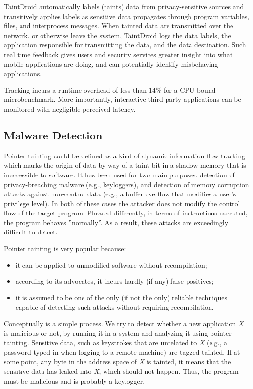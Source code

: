 TaintDroid automatically labels (taints) data from privacy-sensitive sources and transitively applies labels as sensitive data propagates through program variables, files, and interprocess messages. When tainted data are transmitted over the network, or otherwise leave the system, TaintDroid logs the data labels, the application responsible for transmitting the data, and the data destination. Such real time feedback gives users and security services greater insight into what mobile applications are doing, and can potentially identify misbehaving applications. 

Tracking incurs a runtime overhead of less than 14\% for a CPU-bound microbenchmark. More importantly, interactive third-party applications can be monitored with negligible perceived latency.

\subsection{Malware Detection}
Pointer tainting could be defined as a kind of dynamic information flow tracking which marks the origin of data by way of a taint bit in a shadow memory that is inaccessible to software. It has been used for two main purposes: detection of privacy-breaching malware (e.g., keyloggers), and detection of memory corruption attacks against non-control data (e.g., a buffer overflow that modifies a user’s privilege level). In both of these cases the attacker does not modify the control flow of the target program. Phrased differently, in terms of instructions executed, the program behaves ''normally''. As a result, these attacks are exceedingly difficult to detect.

Pointer tainting is very popular because:
\begin{itemize}
	\item it can be applied to unmodified software without recompilation;
	\item according to its advocates, it incurs hardly (if any) false positives;
	\item it is assumed to be one of the only (if not the only) reliable techniques capable of detecting such attacks without requiring recompilation.
\end{itemize}

Conceptually is a simple process. We try to detect whether a new application \textit{X} is malicious or not, by running it in a system and analyzing it using pointer tainting. Sensitive data, such as keystrokes that are unrelated to \textit{X} (e.g., a password typed in when logging to a remote machine) are tagged tainted. If at some point, any byte in the address space of \textit{X} is tainted, it means that the sensitive data has leaked into \textit{X}, which should not happen. Thus, the program must be malicious and is probably a keylogger.

